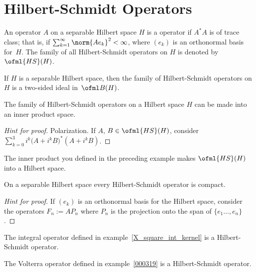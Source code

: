 \section{Hilbert-Schmidt Operators}

\begin{defn} An operator $A$ on a separable Hilbert space $H$ is a
 operator if $A^*A$ is of trace class; that is, if $\sum_{k=1}^\infty \norm{Ae_k}^2 < \infty$,
where $(e_k)$ is an orthonormal basis for~$H$.  The family of all Hilbert-Schmidt operators on $H$ is
denoted by~$\ofml{HS}(H)$.
\end{defn}

\begin{prop} If $H$ is a separable Hilbert space, then the family of Hilbert-Schmidt operators on $H$ is a two-sided
ideal in~$\ofml B(H)$.
\end{prop}

\begin{exam}  The family of Hilbert-Schmidt operators on a Hilbert space $H$ can be made into an inner product space.
\end{exam}

\begin{proof}[\emph{Hint for proof}]  Polarization.  If $A$, $B \in \ofml{HS}(H)$,
consider $\sum_{k=0}^3 i^k \bigl(A + i^kB\bigr)^*(A + i^kB)$.  \ns
\end{proof}

\begin{exam} The inner product you defined in the preceding example makes $\ofml{HS}(H)$ into a Hilbert space.
\end{exam}

\begin{prop} On a separable Hilbert space every Hilbert-Schmidt operator is compact.
\end{prop}

\begin{proof}[\emph{Hint for proof}] If $(e_k)$ is an orthonormal basis for the Hilbert space, consider the
operators $F_n := AP_n$ where $P_n$ is the projection onto the span of $\{e_1 \dots, e_n\}$. \ns
\end{proof}

\begin{exam} The integral operator defined in example~\ref{X_square_int_kernel} is a Hilbert-Schmidt operator.
\end{exam}

\begin{exam}
    The Volterra operator defined in example~\ref{000319} is a Hilbert-Schmidt operator.
\end{exam}











\endinput

